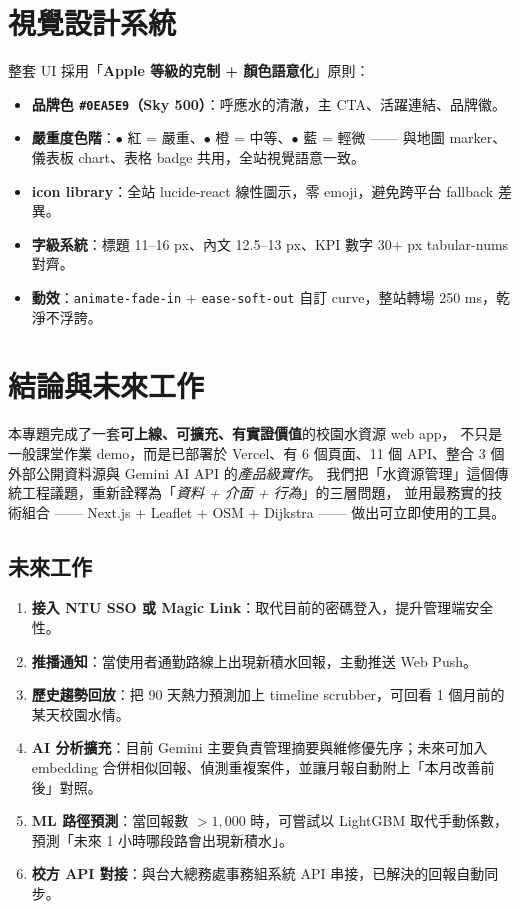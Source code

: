 \documentclass[11pt,a4paper]{article}
\begin{document}
\section{視覺設計系統}

整套 UI 採用「\textbf{Apple 等級的克制 + 顏色語意化}」原則：

\begin{itemize}
\item \textbf{品牌色 \texttt{\#0EA5E9}（Sky 500）}：呼應水的清澈，主 CTA、活躍連結、品牌徽。
\item \textbf{嚴重度色階}：\textcolor{danger}{$\bullet$} 紅 = 嚴重、\textcolor{warn}{$\bullet$} 橙 = 中等、\textcolor{brand}{$\bullet$} 藍 = 輕微 —— 與地圖 marker、儀表板 chart、表格 badge 共用，全站視覺語意一致。
\item \textbf{icon library}：全站 lucide-react 線性圖示，零 emoji，避免跨平台 fallback 差異。
\item \textbf{字級系統}：標題 11--16 px、內文 12.5--13 px、KPI 數字 30+ px tabular-nums 對齊。
\item \textbf{動效}：\texttt{animate-fade-in} + \texttt{ease-soft-out} 自訂 curve，整站轉場 250 ms，乾淨不浮誇。
\end{itemize}

\section{結論與未來工作}

本專題完成了一套\textbf{可上線、可擴充、有實證價值}的校園水資源 web app，
不只是一般課堂作業 demo，而是已部署於 Vercel、有 6 個頁面、11 個 API、整合 3 個外部公開資料源與 Gemini AI API 的\emph{產品級實作}。
我們把「水資源管理」這個傳統工程議題，重新詮釋為「\emph{資料 + 介面 + 行為}」的三層問題，
並用最務實的技術組合 —— Next.js + Leaflet + OSM + Dijkstra —— 做出可立即使用的工具。

\subsection{未來工作}

\begin{enumerate}
\item \textbf{接入 NTU SSO 或 Magic Link}：取代目前的密碼登入，提升管理端安全性。
\item \textbf{推播通知}：當使用者通勤路線上出現新積水回報，主動推送 Web Push。
\item \textbf{歷史趨勢回放}：把 90 天熱力預測加上 timeline scrubber，可回看 1 個月前的某天校園水情。
\item \textbf{AI 分析擴充}：目前 Gemini 主要負責管理摘要與維修優先序；未來可加入 embedding 合併相似回報、偵測重複案件，並讓月報自動附上「本月改善前後」對照。
\item \textbf{ML 路徑預測}：當回報數 $> 1{,}000$ 時，可嘗試以 LightGBM 取代手動係數，預測「未來 1 小時哪段路會出現新積水」。
\item \textbf{校方 API 對接}：與台大總務處事務組系統 API 串接，已解決的回報自動同步。
\end{enumerate}
\end{document}
